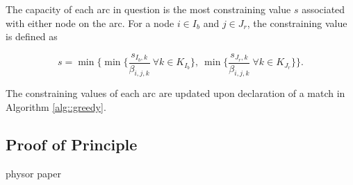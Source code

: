 The capacity of each arc in question is the most constraining value $s$
associated with either node on the arc. For a node $i \in I_b$ and $j \in J_r$,
the constraining value is defined as

\begin{equation}
  s = \min 
        \lbrace 
        \min \lbrace \frac{s_{I_b, k}}{\beta_{i, j, k}} 
        \: \forall k \in K_{I_b} \rbrace, 
        \: \min \lbrace \frac{s_{J_r, k}}{\beta_{i, j, k}} 
        \: \forall k \in K_{J_r} \rbrace
        \rbrace.
\end{equation}

The constraining values of each arc are updated upon declaration of a match in
Algorithm \ref{alg::greedy}.

\subsection{Proof of Principle}

physor paper

